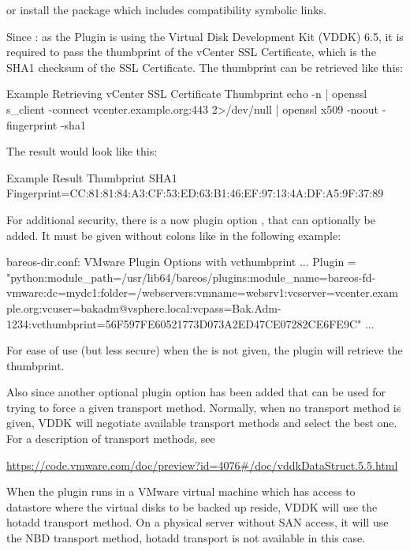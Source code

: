 or install the  package which includes compatibility symbolic links.

Since : as the Plugin is using
the Virtual Disk Development Kit (VDDK) 6.5, it is required to pass the thumbprint
of the vCenter SSL Certificate, which is the SHA1 checksum of the SSL Certificate.
The thumbprint can be retrieved like this:

\begin{commands}{Example Retrieving vCenter SSL Certificate Thumbprint}
echo -n | openssl s_client -connect vcenter.example.org:443 2>/dev/null | openssl x509 -noout -fingerprint -sha1
\end{commands}

The result would look like this:

\begin{commands}{Example Result Thumbprint}
SHA1 Fingerprint=CC:81:81:84:A3:CF:53:ED:63:B1:46:EF:97:13:4A:DF:A5:9F:37:89
\end{commands}

For additional security, there is a now plugin option , that can optionally
be added. It must be given without colons like in the following example:

\begin{bconfig}{bareos-dir.conf: VMware Plugin Options with vcthumbprint}
    ...
    Plugin = "python:module_path=/usr/lib64/bareos/plugins:module_name=bareos-fd-vmware:dc=mydc1:folder=/webservers:vmname=websrv1:vcserver=vcenter.example.org:vcuser=bakadm@vsphere.local:vcpass=Bak.Adm-1234:vcthumbprint=56F597FE60521773D073A2ED47CE07282CE6FE9C"
    ...
\end{bconfig}

For ease of use (but less secure) when the  is not given, the plugin
will retrieve the thumbprint.

Also since  another optional plugin option has
been added that can be used for trying to force a given transport method. Normally, when
no transport method is given, VDDK will negotiate available transport methods and select
the best one. For a description of transport methods, see

\url{https://code.vmware.com/doc/preview?id=4076#/doc/vddkDataStruct.5.5.html}

When the plugin runs in a VMware virtual machine which has access to datastore where the
virtual disks to be backed up reside, VDDK will use the hotadd transport method.
On a physical server without SAN access, it will use the NBD transport method, hotadd
transport is not available in this case.

